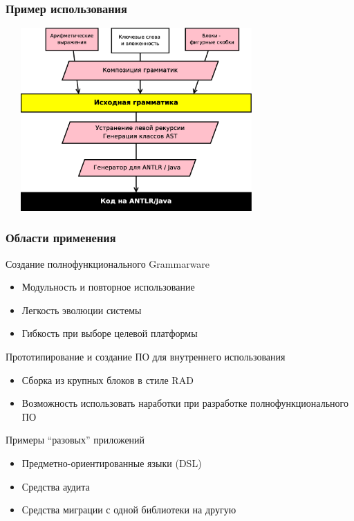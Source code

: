 \documentclass[paper=screen,10pt,unicode]{beamer}
\begin{document}
\begin{frame}
	\frametitle{Пример использования}
	\begin{center}
 		\includegraphics[width=100mm,height=70mm]{grammatic_usage_example.eps}	
	\end{center}
\end{frame}

\begin{frame}
	\frametitle{Области применения}

	\begin{block}{Создание полнофункционального Grammarware}
			\begin{itemize}
				\item Модульность и повторное использование
				\item Легкость эволюции системы
				\item Гибкость при выборе целевой платформы
			\end{itemize}
	\end{block}
	\begin{block}{Прототипирование и создание ПО для внутреннего использования}
			\begin{itemize}
				\item Сборка из крупных блоков в стиле RAD
				\item Возможность использовать наработки при разработке полнофункционального ПО 
			\end{itemize}
	\end{block}
	\begin{block}{Примеры ``разовых'' приложений}
		\begin{itemize}
			\item Предметно-ориентированные языки (DSL)
			\item Средства аудита
			\item Средства миграции с одной библиотеки на другую
		\end{itemize}
	\end{block}
\end{frame}
\end{document}
